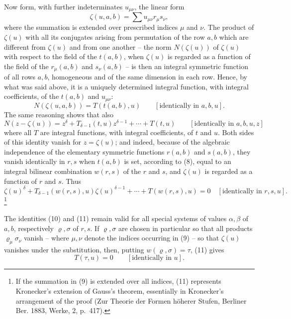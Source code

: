 \documentclass[11pt]{article}
\begin{document}
Now form, with further indeterminates $u_{\mu\nu}$, the linear form
\begin{equation}
 \zeta(u,a,b)=\sum u_{\mu\nu}r_\mu s_\nu,
\tag{9}
\end{equation}
where the summation is extended over prescribed indices $\mu$ and $\nu$. The product of $\zeta(u)$ with all its conjugates arising from permutation of the row $a,b$ which are different from $\zeta(u)$ and from one another -- the norm $N(\zeta(u))$ of $\zeta(u)$ with respect to the field of the $t(a,b)$, when $\zeta(u)$ is regarded as a function of the field of the $r_\mu(a,b)$ and $s_\nu(a,b)$ -- is then an integral symmetric function of all rows $a,b$, homogeneous and of the same dimension in each row. Hence, by what was said above, it is a uniquely determined integral function, with integral coefficients, of the $t(a,b)$ and $u_{\mu\nu}$:
\begin{equation}
 N(\zeta(u,a,b))=T(t(a,b),u)\qquad[\text{identically in }a,b,u].
\tag{10}
\end{equation}
The same reasoning shows that also
\[
N(z-\zeta(u))=z^\delta+T_{\delta-1}(t,u)z^{\delta-1}+\cdots+T(t,u)
\qquad[\text{identically in }a,b,u,z]
\]
where all $T$ are integral functions, with integral coefficients, of $t$ and $u$. Both sides of this identity vanish for $z=\zeta(u)$; and indeed, because of the algebraic independence of the elementary symmetric functions $r(a,b)$ and $s(a,b)$, they vanish identically in $r,s$ when $t(a,b)$ is set, according to (8), equal to an integral bilinear combination $w(r,s)$ of the $r$ and $s$, and $\zeta(u)$ is regarded as a function of $r$ and $s$. Thus
\begin{equation}
\zeta(u)^\delta+T_{\delta-1}(w(r,s),u)\zeta(u)^{\delta-1}+\cdots+T(w(r,s),u)=0
\quad[\text{identically in }r,s,u].
\tag{11}
\end{equation}\footnote{If the summation in (9) is extended over all indices, (11) represents Kronecker's extension of Gauss's theorem, essentially in Kronecker's arrangement of the proof (Zur Theorie der Formen höherer Stufen, Berliner Ber. 1883, Werke, 2, p.~417).}

The identities (10) and (11) remain valid for all special systems of values $\alpha,\beta$ of $a,b$, respectively $\varrho,\sigma$ of $r,s$. If $\varrho,\sigma$ are chosen in particular so that all products $\varrho_\mu\sigma_\nu$ vanish -- where $\mu,\nu$ denote the indices occurring in (9) -- so that $\zeta(u)$ vanishes under the substitution, then, putting $w(\varrho,\sigma)=\tau$, (11) gives
\begin{equation}
 T(\tau,u)=0\qquad[\text{identically in }u].
\tag{12}
\end{equation}
\end{document}

